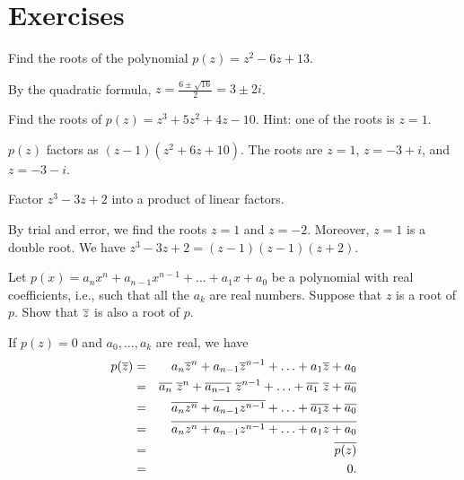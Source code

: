 \section*{Exercises}

\begin{ex}
  Find the roots of the polynomial $p(z) = z^2-6z+13$.
  \begin{sol}
    By the quadratic formula, $\displaystyle z=\frac{6\pm\sqrt{16}}{2}
      = 3\pm 2i$.
  \end{sol}
\end{ex}

\begin{ex}
  Find the roots of $p(z) = z^3 + 5z^2 + 4z - 10$. Hint: one of the
  roots is $z=1$.
  \begin{sol}
    $p(z)$ factors as $(z-1)(z^2+6z+10)$. The roots are $z=1$,
    $z=-3+i$, and $z=-3-i$.
  \end{sol}
\end{ex}

\begin{ex}
  Factor $z^3 - 3z + 2$ into a product of linear factors.
  \begin{sol}
    By trial and error, we find the roots $z=1$ and $z=-2$. Moreover,
    $z=1$ is a double root. We have $z^3 - 3z + 2 = (z-1)(z-1)(z+2)$.
  \end{sol}
\end{ex}

\begin{ex}
  Let $p(x) =a_nx^n+a_{n-1}x^{n-1}+\ldots+a_1x+a_0$ be a
  polynomial with real coefficients, i.e., such that all the $a_k$
  are real numbers. Suppose that $z$ is a root of $p$. Show that
  $\overline{z}$ is also a root of $p$.
  \begin{sol}
    If $p(z) =0$ and $a_0,\ldots,a_k$ are real, we have
    \begin{eqnarray*}
      p(\overline{z})
      &=& a_n\overline{z}^n+a_{n-1}\overline{z}^{n-1}+\ldots+a_1\overline{z}+a_0 \\
      &=&\overline{a_n}\ \overline{z}^n+\overline{a_{n-1}}
          \ \overline{z}^{n-1}+\ldots+\overline{a_1}
          \ \overline{z}+\overline{a_0}
      \\
      &=& \overline{a_nz^n}+\overline{a_{n-1}z^{n-1}}+\ldots+\overline{a_1z}+
          \overline{a_0} \\
      &=& \overline{a_nz^n+a_{n-1}z^{n-1}+\ldots+a_1z+a_0} \\
      &=& \overline{p(z) } \\
      &=& 0.
    \end{eqnarray*}
  \end{sol}
\end{ex}

